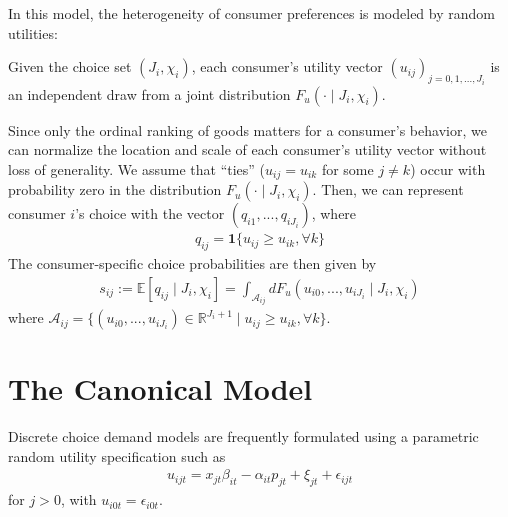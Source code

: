 \documentclass[11pt]{elegantbook}
\begin{document}
In this model, the heterogeneity of consumer preferences is modeled by random utilities:
\begin{definition}
    Given the choice set $(J_i, \chi_i)$, each consumer's utility vector $(u_{ij})_{j=0,1,...,J_i}$ is an independent draw from a joint distribution $F_u(\cdot\mid J_i, \chi_i)$.
\end{definition}
Since only the ordinal ranking of goods matters for a consumer's behavior, we can normalize the location and scale of each consumer's utility vector without loss of generality. We assume that ``ties'' ($u_{ij}=u_{ik}$ for some $j\neq k$) occur with probability zero in the distribution $F_u(\cdot\mid J_i, \chi_i)$. Then, we can represent consumer $i$'s choice with the vector $(q_{i1},...,q_{iJ_i})$, where
\begin{equation}
    \begin{aligned}
        q_{ij}=\mathbf{1}\{u_{ij}\geq u_{ik},\forall k\}
    \end{aligned}
    \nonumber
\end{equation}
The consumer-specific choice probabilities are then given by
\begin{equation}
    \begin{aligned}
        s_{ij}:=\mathbb{E}[q_{ij}\mid J_i,\chi_i]=\int_{\mathcal{A}_{ij}}d F_u\left(u_{i0},...,u_{iJ_i}\mid J_i, \chi_i\right)
    \end{aligned}
    \nonumber
\end{equation}
where $\mathcal{A}_{ij}=\{(u_{i0},...,u_{iJ_i})\in\mathbb{R}^{J_i+1}\mid u_{ij}\geq u_{ik},\forall k\}$.


\section{The Canonical Model}
\begin{definition}
    Discrete choice demand models are frequently formulated using a parametric random utility specification such as
    \begin{equation}
        \begin{aligned}
            u_{ijt}=x_{jt}\beta_{it}-\alpha_{it}p_{jt}+\xi_{jt}+\epsilon_{ijt}
        \end{aligned}
        \nonumber
    \end{equation}
    for $j>0$, with $u_{i0t}=\epsilon_{i0t}$.
\end{definition}
\end{document}
